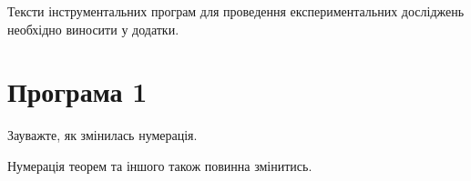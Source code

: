 \label{appendix:A}

Тексти інструментальних програм для проведення експериментальних досліджень необхідно
виносити у додатки.

\section{Програма 1}

Зауважте, як змінилась нумерація.

\begin{theorem}
    Нумерація теорем та іншого також повинна змінитись.
\end{theorem}